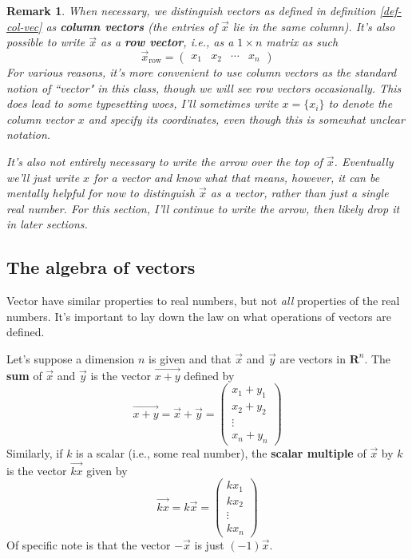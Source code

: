 \documentclass[12pt]{article}
\numberwithin{equation}{subsection}
\numberwithin{figure}{subsection}
\theoremstyle{note}
\newtheorem{remark}[subsection]{Remark}
\begin{document}
\begin{remark}
When necessary, we distinguish vectors as defined in definition \ref{def-col-vec} as \textbf{column vectors} (the entries of $\vec{x}$ lie in the same column). It's also possible to write $\vec{x}$ as a \textbf{row vector}, i.e., as a $1\times n$ matrix as such\[ \vec{x}_{\text{row}}=\begin{pmatrix} x_1 & x_2 & \cdots & x_n\end{pmatrix}\] For various reasons, it's more convenient to use column vectors as the standard notion of ``vector" in this class, though we will see row vectors occasionally.  This does lead to some typesetting woes, I'll sometimes write $x=\{x_i\}$ to denote the column vector $x$ and specify its coordinates, even though this is somewhat unclear notation. 

It's also not \textit{entirely} necessary to write the arrow over the top of $\vec{x}$. Eventually we'll just write $x$ for a vector and \textit{know} what that means, however, it can be mentally helpful for now to distinguish $\vec{x}$ as a vector, rather than just a single real number. For this section, I'll continue to write the arrow, then likely drop it in later sections. 
\end{remark}

\subsection{The algebra of vectors}
Vector have similar properties to real numbers, but not \textit{all} properties of the real numbers. It's important to lay down the law on what operations of vectors are defined. 

Let's suppose a dimension $n$ is given and that $\vec{x}$ and $\vec{y}$ are vectors in $\mathbf{R}^n$. The \textbf{sum} of $\vec{x}$ and $\vec{y}$ is the vector $\overrightarrow{x+y}$ defined by \begin{equation} \overrightarrow{x+y}=\vec{x}+\vec{y}=\begin{pmatrix} x_1 + y_1 \\ x_2 + y_2 \\ \vdots \\ x_n + y_n \end{pmatrix}\end{equation}
Similarly, if $k$ is a scalar (i.e., some real number), the \textbf{scalar multiple} of $\vec{x}$ by $k$ is the vector $\overrightarrow{kx}$ given by 
 \begin{equation}\overrightarrow{kx}=k\vec{x}= \begin{pmatrix} kx_1 \\ kx_2 \\ \vdots \\ kx_n \end{pmatrix}\end{equation}
Of specific note is that the vector $-\vec{x}$ is just $(-1) \vec{x}$. %
\end{document}
